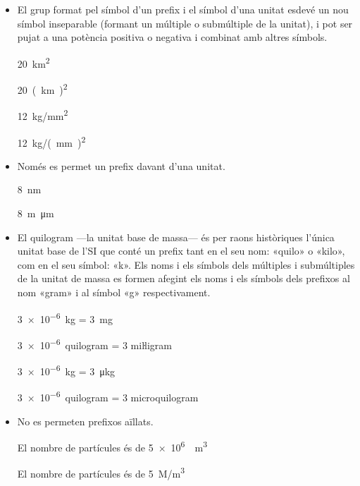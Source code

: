 \begin{itemize}
\textcolor{Green}\faCheckSquare{} \qty{12}{mm}

\textcolor{Red}\faTimesCircle{} 12 m\,m

\textcolor{Green}\faCheckSquare{}  \qty{3}{GHz}

\textcolor{Red}\faTimesCircle{}  3 G\,Hz


\item El grup format pel símbol d'un prefix i el símbol d'una unitat
esdevé un nou símbol inseparable (formant un múltiple o submúltiple
de la unitat), i pot ser pujat a una potència positiva o negativa i
combinat amb altres símbols.

\textcolor{Green}\faCheckSquare{} \qty{20}{km^2}

\textcolor{Red}\faTimesCircle{} \qty{20}{(km)^2}

\textcolor{Green}\faCheckSquare{}  \qty{12}{kg/mm^2}

\textcolor{Red}\faTimesCircle{}  \qty{12}{kg/(mm)^2}


\item Només es permet un prefix davant d'una unitat.

\textcolor{Green}\faCheckSquare{} \qty{8}{nm}

\textcolor{Red}\faTimesCircle{} \qty{8}{m\micro m}


\item El quilogram ---la unitat base de massa--- és per raons històriques l'única unitat base de l'SI que conté un prefix tant en el seu nom: «quilo» o «kilo», com en el seu símbol: «k». Els noms i els símbols dels múltiples i submúltiples de la unitat de massa es formen afegint els noms i els símbols dels prefixos al nom «gram» i al símbol «g» respectivament.

\textcolor{Green}\faCheckSquare{} \qty{3e-6}{kg} = \qty{3}{mg}

\textcolor{Green}\faCheckSquare{} \qty{3e-6}{quilogram} = 3 miŀligram

\textcolor{Red}\faTimesCircle{} \qty{3e-6}{kg} = \qty{3}{\micro kg}

\textcolor{Red}\faTimesCircle{} \qty{3e-6}{quilogram} = 3 microquilogram


\item No es permeten prefixos aïllats.

\textcolor{Green}\faCheckSquare{} El nombre de partícules és de \qty[per-mode = symbol]{5e6}{\per\cubic\metre}

\textcolor{Red}\faTimesCircle{} El nombre de partícules és de \qty{5}{M/m^3}



\end{itemize}
